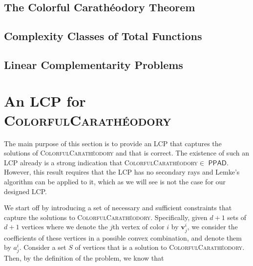 \documentclass[a4paper,11pt]{article}
\def\cc#1{\mathsf{#1}}
\def\PPAD{\ensuremath{\cc{PPAD}}\xspace}
\def\problem#1{\textsc{#1}}
\def\CC{Colorful Carath\'eodory }
\def\v{\textbf{v}}
\def\CCP{\problem{ColorfulCarath\'eodory}\xspace}
\begin{document}

\subsection{The \CC Theorem}

\subsection{Complexity Classes of Total Functions}

\subsection{Linear Complementarity Problems}

\section{An LCP for \CCP}

\par The main purpose of this section is to provide an LCP that captures the solutions of \CCP and that is
correct. The existence of such an LCP already is a strong indication that \CCP $\in$ \PPAD. However, this
result requires that the LCP has no secondary rays and Lemke's algorithm can be applied to it, which as we
will see is not the case for our designed LCP.

\par We start off by introducing a set of necessary and sufficient constraints that capture the solutions to
\CCP. Specifically, given $d+1$ sets of $d+1$ vertices where we denote the $j$th vertex of color $i$ by
$\v^i_j$, we consider the coefficients of these vertices in a possible convex combination, and denote them
by $a^i_j$. Consider a set $S$ of vertices that is a solution to \CCP. Then, by the definition of the problem,
we know that
\end{document}
